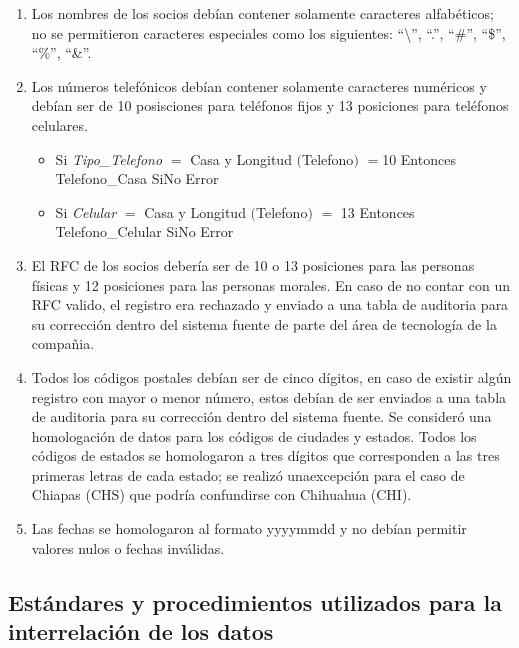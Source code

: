 \begin{enumerate}

\item Los nombres de los socios debían contener solamente caracteres
  alfabéticos; no se permitieron caracteres especiales como los siguientes:
  ``\textbackslash'', ``.'', ``\#'', ``\$'', ``\%'', ``\&''.

\item Los números telefónicos debían contener solamente caracteres numéricos y
  debían ser de 10 posisciones para teléfonos fijos y 13 posiciones para
  teléfonos celulares.

  \begin{itemize}
  \item Si \textit{Tipo\_Telefono} $=$ Casa y Longitud $($Telefono$)$ $=$10
    Entonces Telefono\_Casa SiNo Error
  \item Si \textit{Celular} $=$ Casa y Longitud $($Telefono$)$ $=$ 13 Entonces
    Telefono\_Celular SiNo Error
  \end{itemize}

\item El RFC de los socios debería ser de 10 o 13 posiciones para las personas
  físicas y 12 posiciones para las personas morales. En caso de no contar con un
  RFC valido, el registro era rechazado y enviado a una tabla de auditoria para
  su corrección dentro del sistema fuente de parte del área de tecnología de la
  compañia.

\item Todos los códigos postales debían ser de cinco dígitos, en caso de existir
  algún registro con mayor o menor número, estos debían de ser enviados a una
  tabla de auditoria para su corrección dentro del sistema fuente. Se consideró
  una homologación de datos para los códigos de ciudades y estados. Todos los
  códigos de estados se homologaron a tres dígitos que corresponden a las tres
  primeras letras de cada estado; se realizó unaexcepción para el caso de
  Chiapas (CHS) que podría confundirse con Chihuahua (CHI).

\item Las fechas se homologaron al formato yyyymmdd y no debían permitir valores
  nulos o fechas inválidas.

\end{enumerate}

\subsection{Estándares y procedimientos utilizados para la interrelación de los datos}

